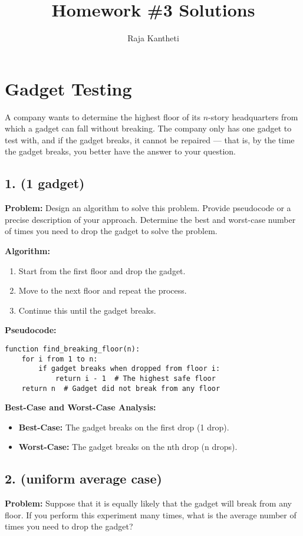 \documentclass{article}
\title{Homework \#3 Solutions}
\author{Raja Kantheti}
\date{}
\begin{document}
\maketitle

\section*{Gadget Testing}

A company wants to determine the highest floor of its \( n \)-story headquarters from which a gadget can fall without breaking. The company only has one gadget to test with, and if the gadget breaks, it cannot be repaired — that is, by the time the gadget breaks, you better have the answer to your question.

\subsection*{1. (1 gadget)}
\textbf{Problem:} Design an algorithm to solve this problem. Provide pseudocode or a precise description of your approach. Determine the best and worst-case number of times you need to drop the gadget to solve the problem.

\textbf{Algorithm:}
\begin{enumerate}
    \item Start from the first floor and drop the gadget.
    \item Move to the next floor and repeat the process.
    \item Continue this until the gadget breaks.
\end{enumerate}

\textbf{Pseudocode:}
\begin{verbatim}
function find_breaking_floor(n):
    for i from 1 to n:
        if gadget breaks when dropped from floor i:
            return i - 1  # The highest safe floor
    return n  # Gadget did not break from any floor
\end{verbatim}

\textbf{Best-Case and Worst-Case Analysis:}
\begin{itemize}
    \item \textbf{Best-Case:} The gadget breaks on the first drop (1 drop).
    \item \textbf{Worst-Case:} The gadget breaks on the nth drop (n drops).
\end{itemize}

\subsection*{2. (uniform average case)}
\textbf{Problem:} Suppose that it is equally likely that the gadget will break from any floor. If you perform this experiment many times, what is the average number of times you need to drop the gadget?
\end{document}
